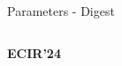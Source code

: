 \documentclass[en,16:9,smallfoot]{sdqbeamer}
\begin{document}
\begin{frame}{Parameters - Digest}
\begin{columns}
           \begin{infobox-pub-small}
           \textbf{ECIR'24}~\cite{Saier2024HyperPIE}
           \end{infobox-pub-small}
   \end{columns}
   \end{frame}

\end{document}
